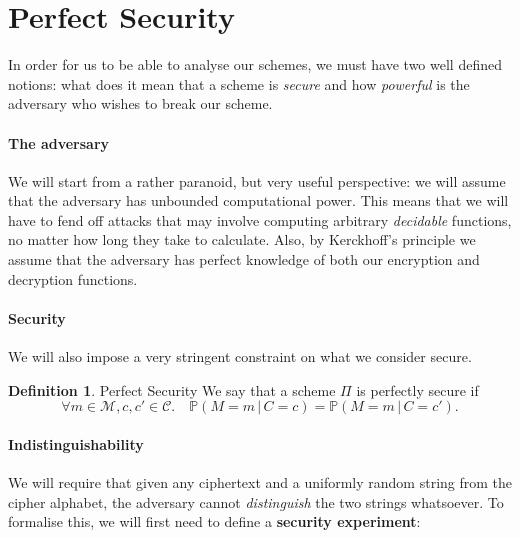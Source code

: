 \documentclass{article}
\theoremstyle{definition}
\newtheorem{definition}{Definition}[section]
\renewcommand{\C}{\mathcal{C}}
\newcommand{\M}{\mathcal{M}}
\newcommand{\C}{\mathcal{C}}
\newcommand{\Prob}{\mathbb{P}}
\begin{document}
\section{Perfect Security}
In order for us to be able to analyse our schemes, we must have two well defined
notions: what does it mean that a scheme is \textit{secure} and how \textit{powerful} is
the adversary who wishes to break our scheme.
\paragraph{The adversary} We will start from a rather
paranoid, but very useful perspective: we will assume that the adversary has
unbounded computational power. This means that we will have to fend off attacks
that may involve computing arbitrary \textit{decidable} functions, no matter how
long they take to calculate. Also, by Kerckhoff's principle we assume that the
adversary has perfect knowledge of both our encryption and decryption functions.
\paragraph{Security} We will also impose a very stringent constraint on what we
consider secure.
\begin{definition}{Perfect Security}
  \label{def:perfect_security}
We say that a scheme $\Pi$ is perfectly secure if
\[
  \forall m \in \M, c, c' \in \C.\quad \Prob(M=m \,|\, C=c) = \Prob(M=m \,|\, C=c').
\]
\end{definition}
\paragraph{Indistinguishability} We will require that given any ciphertext and a uniformly
random string from the cipher alphabet, the adversary cannot
\textit{distinguish} the two strings whatsoever. To formalise this, we will
first need to define a \textbf{security experiment}:
\end{document}
